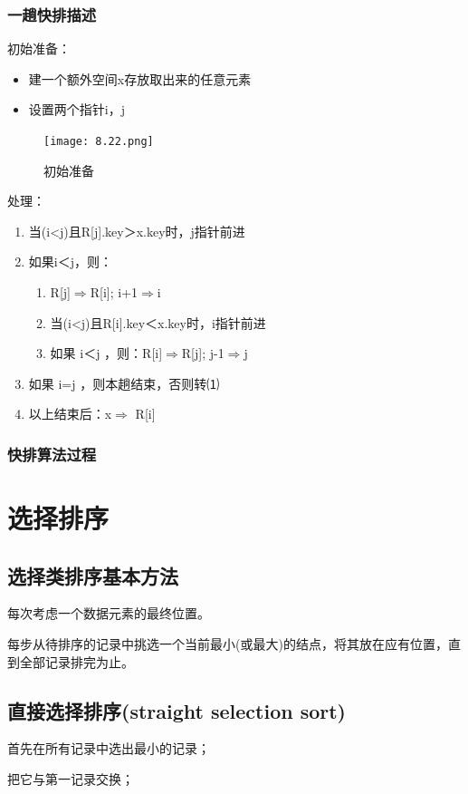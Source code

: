 \documentclass[AutoFakeBold]{LZUThesis2007}
\begin{document}
			\subsubsection{一趟快排描述}
初始准备：
\begin{itemize}
	\item 建一个额外空间x存放取出来的任意元素
	\item 设置两个指针i，j
\end{itemize}
\begin{figure}[H]
    \centering
    \texttt{[image: 8.22.png]}
    \caption{初始准备}
    \label{fig_install_texlive}
\end{figure}
处理：
\begin{enumerate}
	\item 当(i<j)且R[j].key＞x.key时，j指针前进
	\item 如果i＜j，则：
\begin{enumerate}
	\item R[j]$\Rightarrow$R[i];  i+1$\Rightarrow$i
	\item 当(i<j)且R[i].key＜x.key时，i指针前进
	\item 如果 i＜j ，则：R[i]$\Rightarrow$R[j];  j-1$\Rightarrow$j
\end{enumerate}
	\item 如果  i=j ，则本趟结束，否则转⑴
	\item 以上结束后：x$\Rightarrow$ R[i]
\end{enumerate}
			\subsubsection{快排算法过程}

	\section{选择排序}
		\subsection{选择类排序基本方法}
		每次考虑一个数据元素的最终位置。

        每步从待排序的记录中挑选一个当前最小(或最大)的结点，将其放在应有位置，直到全部记录排完为止。
		\subsection{直接选择排序(straight  selection sort)}
		首先在所有记录中选出最小的记录；

		把它与第一记录交换；
		
\end{document}

